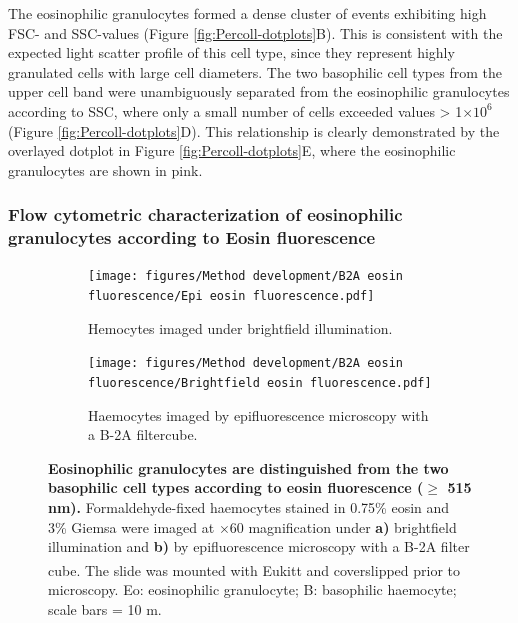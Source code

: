 The eosinophilic granulocytes formed a dense cluster of events exhibiting high FSC- and SSC-values (Figure \ref{fig:Percoll-dotplots}B). This is consistent with the expected light scatter profile of this cell type, since they represent highly granulated cells with large cell diameters. The two basophilic cell types from the upper cell band were unambiguously separated from the eosinophilic granulocytes according to SSC, where only a small number of cells exceeded values > 1$\times 10^{6}$ (Figure \ref{fig:Percoll-dotplots}D). This relationship is clearly demonstrated by the overlayed dotplot in Figure \ref{fig:Percoll-dotplots}E, where the eosinophilic granulocytes are shown in pink.

\subsubsection{Flow cytometric characterization of eosinophilic granulocytes according to Eosin fluorescence}



\begin{figure}[H]
    \centering
    \begin{subfigure}[b]{.45\textwidth}
        \centering
        \texttt{[image: figures/Method development/B2A eosin fluorescence/Epi eosin fluorescence.pdf]}
        \caption{Hemocytes imaged under brightfield illumination.}
        \label{ffig:a}
    \end{subfigure}
    \hfill
    \begin{subfigure}[b]{.45\textwidth}
        \centering
        \texttt{[image: figures/Method development/B2A eosin fluorescence/Brightfield eosin fluorescence.pdf]}
        \caption{Haemocytes imaged by epifluorescence microscopy with a B-2A filtercube.}
        \label{ffig:b}
    \end{subfigure}
    \caption{\textbf{Eosinophilic granulocytes are distinguished from the two basophilic cell types according to eosin fluorescence ($\geq$ 515 nm).} Formaldehyde-fixed haemocytes stained in 0.75\% eosin and 3\% Giemsa were imaged at $\times$60 magnification under \textbf{a)} brightfield illumination and \textbf{b)} by epifluorescence microscopy with a B-2A filter cube. The slide was mounted with Eukitt\textsuperscript{\textregistered} and coverslipped prior to microscopy. Eo: eosinophilic granulocyte; B: basophilic haemocyte; scale bars = 10 \micro m. }
    \label{fig:Eosin_fluorescence_B2A}
\end{figure}


